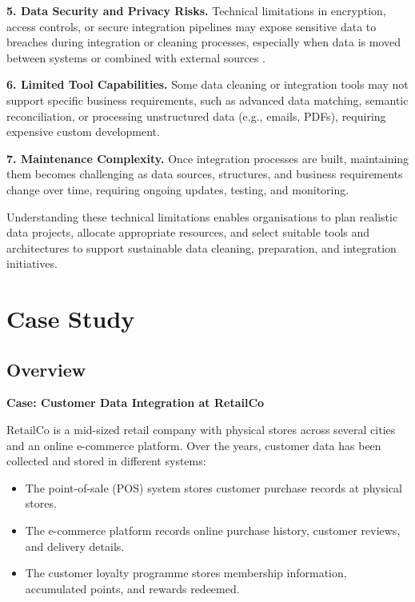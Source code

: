 \textbf{5. Data Security and Privacy Risks.}  
Technical limitations in encryption, access controls, or secure integration pipelines may expose sensitive data to breaches during integration or cleaning processes, especially when data is moved between systems or combined with external sources \cite{zhang2019security}.

\textbf{6. Limited Tool Capabilities.}  
Some data cleaning or integration tools may not support specific business requirements, such as advanced data matching, semantic reconciliation, or processing unstructured data (e.g., emails, PDFs), requiring expensive custom development.

\textbf{7. Maintenance Complexity.}  
Once integration processes are built, maintaining them becomes challenging as data sources, structures, and business requirements change over time, requiring ongoing updates, testing, and monitoring.

Understanding these technical limitations enables organisations to plan realistic data projects, allocate appropriate resources, and select suitable tools and architectures to support sustainable data cleaning, preparation, and integration initiatives.


\section{Case Study}

\subsection{Overview}

\textbf{Case: Customer Data Integration at RetailCo}

RetailCo is a mid-sized retail company with physical stores across several cities and an online e-commerce platform. Over the years, customer data has been collected and stored in different systems:

\begin{itemize}
	\item The point-of-sale (POS) system stores customer purchase records at physical stores.
	\item The e-commerce platform records online purchase history, customer reviews, and delivery details.
	\item The customer loyalty programme stores membership information, accumulated points, and rewards redeemed.
\end{itemize}

